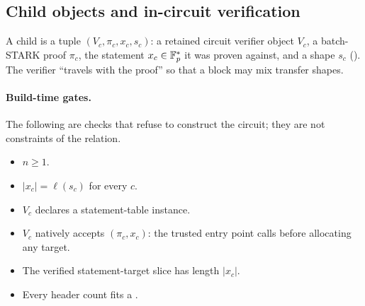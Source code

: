 \subsection{Child objects and in-circuit verification}
\label{subsec:block-child}

\begin{definition}[Child]
A child is a tuple $(V_c, \pi_c, x_c, s_c)$: a retained circuit verifier object
$V_c$, a batch-STARK proof $\pi_c$, the statement $x_c \in \mathbb{F}_p^{*}$ it was proven
against, and a shape $s_c$ (). The verifier ``travels with the
proof'' so that a block may mix transfer shapes.
\end{definition}

\paragraph{Build-time gates.}
The following are checks that refuse to construct the circuit; they are not
constraints of the relation.
\begin{itemize}
\item $n \ge 1$. 
\item $|x_c| = \ell(s_c)$ for every $c$. 
\item $V_c$ declares a statement-table instance.
\item $V_c$ natively accepts $(\pi_c, x_c)$: the trusted entry point calls
   before allocating any target.
\item The verified statement-target slice has length $|x_c|$.
\item Every header count fits a .
\end{itemize}

